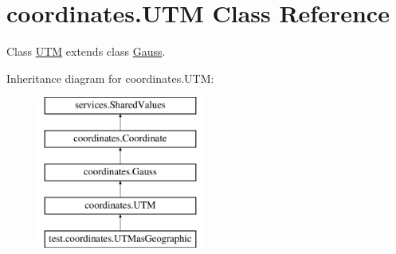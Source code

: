 \hypertarget{classcoordinates_1_1_u_t_m}{}\section{coordinates.\+U\+TM Class Reference}
\label{classcoordinates_1_1_u_t_m}


Class \hyperlink{classcoordinates_1_1_u_t_m}{U\+TM} extends class \hyperlink{classcoordinates_1_1_gauss}{Gauss}.  


Inheritance diagram for coordinates.\+U\+TM\+:\begin{figure}[H]
\begin{center}
\leavevmode
\includegraphics[height=5.000000cm]{classcoordinates_1_1_u_t_m}
\end{center}
\end{figure}
